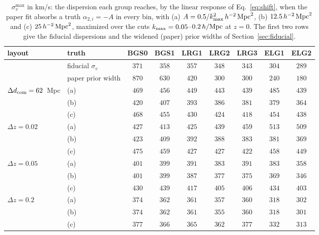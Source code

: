\documentclass[11pt]{article}
\newcommand{\kmax}{k_{\rm max}}
\newcommand{\hMpc}{\,h/{\rm Mpc}}
\newcommand{\aunit}{\,h^{-2}\,{\rm Mpc}^2}
\begin{document}
\begin{table}[tbp]
  \centering
  \setlength{\tabcolsep}{4pt}
  \begin{tabular}{llccccccc}
    \hline
    layout & truth & BGS0 & BGS1 & LRG1 & LRG2 & LRG3 & ELG1 & ELG2 \\
    \hline
    & fiducial $\sigma_v$ & $371$ & $358$ & $357$ & $348$ & $343$ & $304$ & $289$ \\
    & paper prior width & $870$ & $630$ & $420$ & $300$ & $300$ & $240$ & $180$ \\
    \hline
    $\Delta d_{\rm com} = 62$~Mpc & (a) & $469$ & $456$ & $449$ & $443$ & $439$ & $485$ & $439$ \\
    & (b) & $420$ & $407$ & $393$ & $386$ & $381$ & $379$ & $364$ \\
    & (c) & $468$ & $455$ & $430$ & $424$ & $418$ & $454$ & $438$ \\
    $\Delta z = 0.02$ & (a) & $427$ & $413$ & $425$ & $439$ & $459$ & $513$ & $509$ \\
    & (b) & $423$ & $409$ & $392$ & $388$ & $383$ & $381$ & $369$ \\
    & (c) & $475$ & $459$ & $427$ & $427$ & $422$ & $458$ & $449$ \\
    $\Delta z = 0.05$ & (a) & $401$ & $399$ & $391$ & $383$ & $391$ & $383$ & $358$ \\
    & (b) & $401$ & $399$ & $387$ & $377$ & $375$ & $369$ & $346$ \\
    & (c) & $430$ & $439$ & $417$ & $405$ & $406$ & $434$ & $403$ \\
    $\Delta z = 0.2$ & (a) & $374$ & $362$ & $361$ & $357$ & $360$ & $318$ & $302$ \\
    & (b) & $374$ & $362$ & $361$ & $355$ & $360$ & $318$ & $301$ \\
    & (c) & $377$ & $366$ & $365$ & $362$ & $377$ & $332$ & $313$ \\
    \hline
  \end{tabular}
  \caption{$\sigma_v^{\max}$ in km/s: the dispersion each group
    reaches, by the linear response of Eq.~\eqref{eq:shift}, when the
    paper fit absorbs a truth $\alpha_{2,i} = -A$ in every bin, with
    (a) $A = 0.5/\kmax^2\aunit$, (b) $12.5\aunit$ and (c) $25\aunit$,
    maximized over the cuts $\kmax = 0.05$--$0.2\hMpc$ at $z = 0$.
    The first two rows give the fiducial dispersions and the widened
    (paper) prior widths of Section~\ref{sec:fiducial}.}
  \label{tab:sigvmax}
\end{table}
\end{document}

